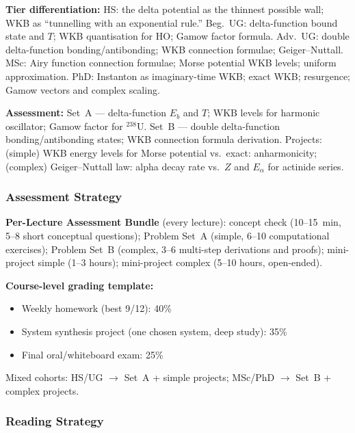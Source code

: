 \documentclass[11pt,a4paper]{article}
\begin{document}
\begin{tcolorbox}[modulebox, title={Module~I.4 / L12: Delta-Function Potential and WKB Tunnelling}]
\medskip\textbf{Tier differentiation:}
HS: the delta potential as the thinnest possible wall; WKB as ``tunnelling with an exponential rule.''
Beg.\ UG: delta-function bound state and $T$; WKB quantisation for HO; Gamow factor formula.
Adv.\ UG: double delta-function bonding/antibonding; WKB connection formulae; Geiger--Nuttall.
MSc: Airy function connection formulae; Morse potential WKB levels; uniform approximation.
PhD: Instanton as imaginary-time WKB; exact WKB; resurgence; Gamow vectors and complex scaling.

\medskip\textbf{Assessment:}
Set~A --- delta-function $E_b$ and $T$; WKB levels for harmonic oscillator; Gamow factor for $^{238}$U.
Set~B --- double delta-function bonding/antibonding states; WKB connection formula derivation.
Projects: (simple) WKB energy levels for Morse potential vs.\ exact: anharmonicity;
(complex) Geiger--Nuttall law: alpha decay rate vs.\ $Z$ and $E_\alpha$ for actinide series.
\end{tcolorbox}

\subsubsection*{Assessment Strategy}

\begin{tcolorbox}[highlightbox]
\textbf{Per-Lecture Assessment Bundle} (every lecture):
concept check (10--15~min, 5--8 short conceptual questions);
Problem Set~A (simple, 6--10 computational exercises);
Problem Set~B (complex, 3--6 multi-step derivations and proofs);
mini-project simple (1--3 hours);
mini-project complex (5--10 hours, open-ended).
\end{tcolorbox}

\medskip
\noindent\textbf{Course-level grading template:}
\begin{itemize}[leftmargin=1.5em]
  \item Weekly homework (best 9/12): 40\%
  \item System synthesis project (one chosen system, deep study): 35\%
  \item Final oral/whiteboard exam: 25\%
\end{itemize}
Mixed cohorts: HS/UG $\to$ Set~A + simple projects; MSc/PhD $\to$ Set~B + complex projects.

\subsubsection*{Reading Strategy}
\end{document}

